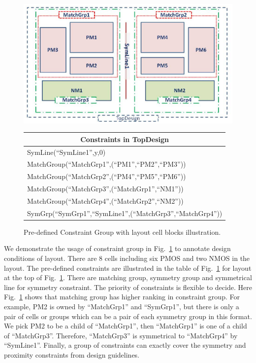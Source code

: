     \begin{figure}[ht]
      \centering
        \includegraphics[width=\textwidth]{Fig/CG/PreCG.eps}
      \begin{scriptsize}
      \begin{tabular}[t]{l}
        \toprule
        \multicolumn{1}{c}{Constraints in TopDesign}  \\
        \midrule
        SymLine(``SymLine1'',y,0) \\
        MatchGroup(``MatchGrp1'',(``PM1'',``PM2'',``PM3'')) \\
        MatchGroup(``MatchGrp2'',(``PM4'',``PM5'',``PM6'')) \\
        MatchGroup(``MatchGrp3'',(``MatchGrp1'',``NM1'')) \\
        MatchGroup(``MatchGrp4'',(``MatchGrp2'',``NM2'')) \\
        SymGrp(``SymGrp1'',``SymLine1'',(``MatchGrp3'',``MatchGrp4''))  \\
      \bottomrule
      \end{tabular}
      \end{scriptsize}
      \caption{Pre-defined Constraint Group with layout cell blocks illustration.}
      \label{fig:PreCG}
    \end{figure}
  
  
    We demonstrate the usage of constraint group in Fig.~\ref{fig:PreCG} to annotate design conditions of layout. There are 8 cells including six PMOS and two NMOS in the layout. The pre-defined constraints are illustrated in the table of Fig.~\ref{fig:PreCG} for layout at the top of Fig.~\ref{fig:PreCG}. There are matching group, symmetry group and symmetrical line for symmetry constraint. The priority of constraints is flexible to decide. Here Fig.~\ref{fig:PreCG} shows that matching group has higher ranking in constraint group. For example, PM2 is owned by ``MatchGrp1'' and ``SymGrp1'', but there is only a pair of cells or groups which can be a pair of each symmetry group in this format. We pick PM2 to be a child of  ``MatchGrp1'', then ``MatchGrp1'' is one of a child of ``MatchGrp3''. Therefore, ``MatchGrp3'' is symmetrical to ``MatchGrp4'' by ``SymLine1''. Finally, a group of constraints can exactly cover the symmetry and proximity constraints from design guidelines.


